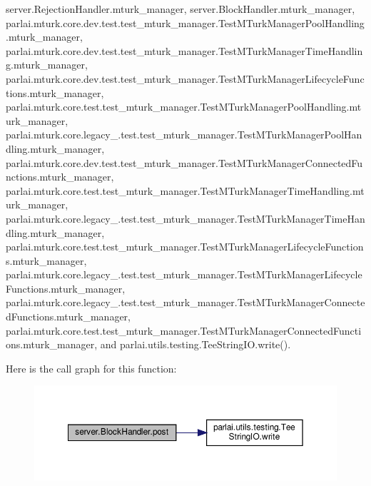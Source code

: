 server.\+Rejection\+Handler.\+mturk\+\_\+manager, server.\+Block\+Handler.\+mturk\+\_\+manager, parlai.\+mturk.\+core.\+dev.\+test.\+test\+\_\+mturk\+\_\+manager.\+Test\+M\+Turk\+Manager\+Pool\+Handling.\+mturk\+\_\+manager, parlai.\+mturk.\+core.\+dev.\+test.\+test\+\_\+mturk\+\_\+manager.\+Test\+M\+Turk\+Manager\+Time\+Handling.\+mturk\+\_\+manager, parlai.\+mturk.\+core.\+dev.\+test.\+test\+\_\+mturk\+\_\+manager.\+Test\+M\+Turk\+Manager\+Lifecycle\+Functions.\+mturk\+\_\+manager, parlai.\+mturk.\+core.\+test.\+test\+\_\+mturk\+\_\+manager.\+Test\+M\+Turk\+Manager\+Pool\+Handling.\+mturk\+\_\+manager, parlai.\+mturk.\+core.\+legacy\+\_.\+test.\+test\+\_\+mturk\+\_\+manager.\+Test\+M\+Turk\+Manager\+Pool\+Handling.\+mturk\+\_\+manager, parlai.\+mturk.\+core.\+dev.\+test.\+test\+\_\+mturk\+\_\+manager.\+Test\+M\+Turk\+Manager\+Connected\+Functions.\+mturk\+\_\+manager, parlai.\+mturk.\+core.\+test.\+test\+\_\+mturk\+\_\+manager.\+Test\+M\+Turk\+Manager\+Time\+Handling.\+mturk\+\_\+manager, parlai.\+mturk.\+core.\+legacy\+\_.\+test.\+test\+\_\+mturk\+\_\+manager.\+Test\+M\+Turk\+Manager\+Time\+Handling.\+mturk\+\_\+manager, parlai.\+mturk.\+core.\+test.\+test\+\_\+mturk\+\_\+manager.\+Test\+M\+Turk\+Manager\+Lifecycle\+Functions.\+mturk\+\_\+manager, parlai.\+mturk.\+core.\+legacy\+\_.\+test.\+test\+\_\+mturk\+\_\+manager.\+Test\+M\+Turk\+Manager\+Lifecycle\+Functions.\+mturk\+\_\+manager, parlai.\+mturk.\+core.\+legacy\+\_.\+test.\+test\+\_\+mturk\+\_\+manager.\+Test\+M\+Turk\+Manager\+Connected\+Functions.\+mturk\+\_\+manager, parlai.\+mturk.\+core.\+test.\+test\+\_\+mturk\+\_\+manager.\+Test\+M\+Turk\+Manager\+Connected\+Functions.\+mturk\+\_\+manager, and parlai.\+utils.\+testing.\+Tee\+String\+I\+O.\+write().

Here is the call graph for this function\+:
\nopagebreak
\begin{figure}[H]
\begin{center}
\leavevmode
\includegraphics[width=350pt]{classserver_1_1BlockHandler_a0c9197b9bce91acb74d1a2da95554d49_cgraph}
\end{center}
\end{figure}


